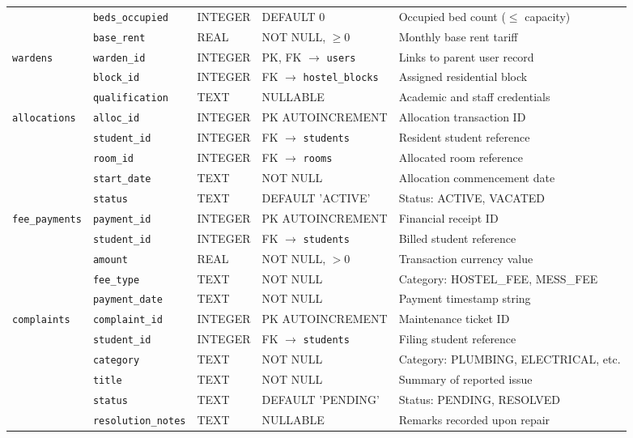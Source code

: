 \documentclass[12pt,a4paper]{report}
\begin{document}
\begin{table}[h]
{\begin{tabular}{lllll}
& \texttt{beds\_occupied} & INTEGER & DEFAULT 0 & Occupied bed count ($\le$ capacity) \\
& \texttt{base\_rent} & REAL & NOT NULL, $\ge 0$ & Monthly base rent tariff \\
\addlinespace
\texttt{wardens} & \texttt{warden\_id} & INTEGER & PK, FK $\to$ \texttt{users} & Links to parent user record \\
& \texttt{block\_id} & INTEGER & FK $\to$ \texttt{hostel\_blocks} & Assigned residential block \\
& \texttt{qualification} & TEXT & NULLABLE & Academic and staff credentials \\
\addlinespace
\texttt{allocations} & \texttt{alloc\_id} & INTEGER & PK AUTOINCREMENT & Allocation transaction ID \\
& \texttt{student\_id} & INTEGER & FK $\to$ \texttt{students} & Resident student reference \\
& \texttt{room\_id} & INTEGER & FK $\to$ \texttt{rooms} & Allocated room reference \\
& \texttt{start\_date} & TEXT & NOT NULL & Allocation commencement date \\
& \texttt{status} & TEXT & DEFAULT 'ACTIVE' & Status: ACTIVE, VACATED \\
\addlinespace
\texttt{fee\_payments} & \texttt{payment\_id} & INTEGER & PK AUTOINCREMENT & Financial receipt ID \\
& \texttt{student\_id} & INTEGER & FK $\to$ \texttt{students} & Billed student reference \\
& \texttt{amount} & REAL & NOT NULL, $> 0$ & Transaction currency value \\
& \texttt{fee\_type} & TEXT & NOT NULL & Category: HOSTEL\_FEE, MESS\_FEE \\
& \texttt{payment\_date} & TEXT & NOT NULL & Payment timestamp string \\
\addlinespace
\texttt{complaints} & \texttt{complaint\_id} & INTEGER & PK AUTOINCREMENT & Maintenance ticket ID \\
& \texttt{student\_id} & INTEGER & FK $\to$ \texttt{students} & Filing student reference \\
& \texttt{category} & TEXT & NOT NULL & Category: PLUMBING, ELECTRICAL, etc. \\
& \texttt{title} & TEXT & NOT NULL & Summary of reported issue \\
& \texttt{status} & TEXT & DEFAULT 'PENDING' & Status: PENDING, RESOLVED \\
& \texttt{resolution\_notes}& TEXT & NULLABLE & Remarks recorded upon repair \\
\bottomrule
\end{tabular}
}
\end{table}
\end{document}
